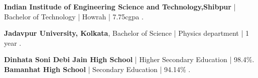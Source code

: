 %
%
%


\begin{scholarship}
					{\textbf{Indian Institude of Engineering Science and Technology,Shibpur} | Bachelor of Technology | Howrah | 7.75cgpa .}
				
					{\textbf{Jadavpur University, Kolkata}, Bachelor of Science | Physics department | 1 year .}
					
					{\textbf{Dinhata Soni Debi Jain High School} | Higher Secondary Education | 98.4\%.}
					{\textbf{Bamanhat High School} | Secondary Education | 94.14\% .}
	
\end{scholarship}